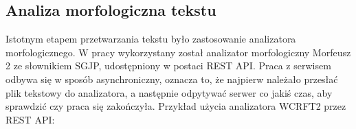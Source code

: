 \clearpage
\subsection{Analiza morfologiczna tekstu}
Istotnym etapem przetwarzania tekstu było zastosowanie analizatora morfologicznego. W pracy wykorzystany został analizator morfologiczny Morfeusz 2 ze słownikiem SGJP, udostępniony w postaci REST API. Praca z serwisem odbywa się w sposób asynchroniczny, oznacza to, że najpierw należało przesłać plik tekstowy do analizatora, a następnie odpytywać serwer co jakiś czas, aby sprawdzić czy praca się zakończyła. Przykład użycia analizatora WCRFT2 przez REST API:


